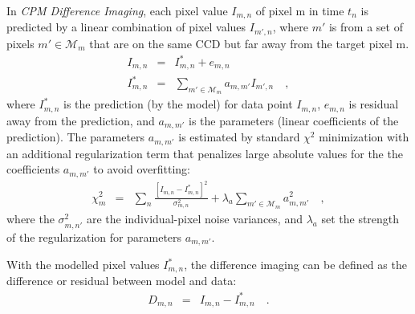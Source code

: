 \documentclass[12pt, preprint]{aastex}
\newcommand{\project}[1]{\textsl{#1}}
\newcommand{\cpmdiff}{\project{CPM Difference Imaging}}
\newcommand{\set}[1]{\mathcal{#1}}
\begin{document}
In \cpmdiff, each pixel value $I_{m,n}$ of pixel m in time $t_n$ is predicted by a linear combination of pixel values $I_{m',n}$, where $m'$ is from a set of pixels $m'\in\set{M}_m$ that are on the same CCD but far away from the target pixel m.
\begin{eqnarray}
I_{m,n}         &=& I^{\ast}_{m,n} + e_{m,n}
\\
I^{\ast}_{m,n}  &=& \sum_{m'\in\set{M}_m} a_{m,m'}I_{m',n} 
\quad,
\end{eqnarray}
where $I^{\ast}_{m,n}$ is the prediction (by the model) for data point $I_{m,n}$, $e_{m,n}$ is residual away from the prediction, and $a_{m,m'}$ is the parameters (linear coefficients of the prediction).
The parameters $a_{m,m'}$ is estimated by standard $\chi^2$ minimization with an additional regularization term that penalizes large absolute values for the the coefficients $a_{m,m'}$ to avoid overfitting:
\begin{eqnarray}
\chi^2_{m}    &=& \sum_{n} \frac{[I_{m,n} - I^{\ast}_{m,n}]^2}{\sigma^2_{m,n}}+ \lambda_{a}\sum_{m'\in\set{M}_m}a_{m,m'}^2 
\quad,
\end{eqnarray}
where the $\sigma^2_{m,n'}$ are the individual-pixel noise variances, and $\lambda_{a}$ set the strength of the regularization for parameters $a_{m,m'}$.

With the modelled pixel values $I^{\ast}_{m,n}$, the difference imaging can be defined as the difference or residual between model and data:
\begin{eqnarray}
D_{m,n} &=& I_{m,n} - I^{\ast}_{m,n}
\quad.
\end{eqnarray}
\end{document}
